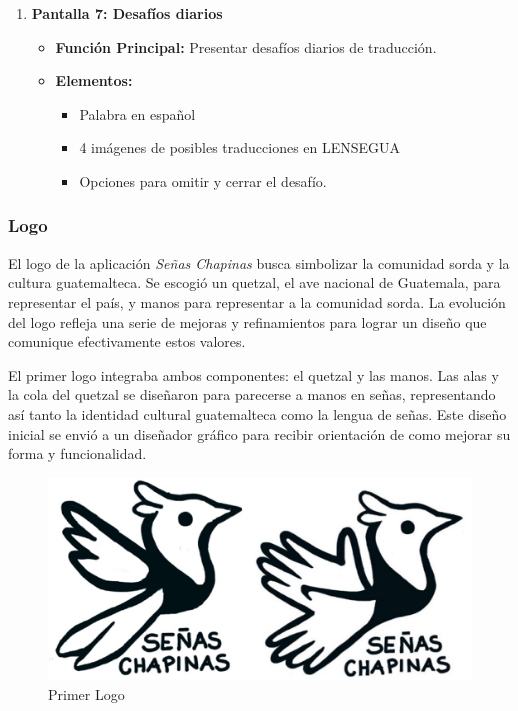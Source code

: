 \begin{enumerate}
    \item \textbf{Pantalla 7: Desafíos diarios}
    \begin{itemize}
        \item \textbf{Función Principal:} Presentar desafíos diarios de traducción.
        \item \textbf{Elementos:}
        \begin{itemize}
            \item Palabra en español
            \item 4 imágenes de posibles traducciones en LENSEGUA
            \item Opciones para omitir y cerrar el desafío.
        \end{itemize}
    \end{itemize}
\end{enumerate}



\subsubsection{Logo}

El logo de la aplicación \textit{Señas Chapinas} busca simbolizar la comunidad sorda y la cultura guatemalteca. Se escogió un quetzal, el ave nacional de Guatemala, para representar el país, y manos para representar a la comunidad sorda. La evolución del logo refleja una serie de mejoras y refinamientos para lograr un diseño que comunique efectivamente estos valores.

El primer logo integraba ambos componentes: el quetzal y las manos. Las alas y la cola del quetzal se diseñaron para parecerse a manos en señas, representando así tanto la identidad cultural guatemalteca como la lengua de señas. Este diseño inicial se envió a un diseñador gráfico para recibir orientación de como mejorar su forma y funcionalidad.

\begin{figure} [H]
    \centering
    \includegraphics[width=0.75\linewidth]{figuras/primerLogo.png}
    \caption{Primer Logo}
    \label{fig:enter-label}
\end{figure}

